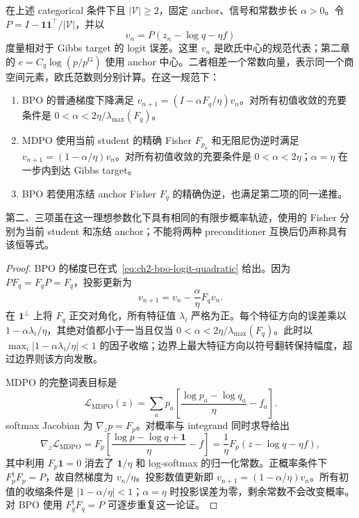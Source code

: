 \begin{theorem}
\label{thm:ch2-inner-logit-step}
在上述 categorical 条件下且 $|\mathcal V|\ge2$，固定 anchor、信号和常数步长 $\alpha>0$。令 $P=I-\mathbf1\mathbf1^\top/|\mathcal V|$，并以
\begin{equation*}
 v_n=P(z_n-\log q-\eta f)
\end{equation*}
度量相对于 Gibbs target 的 logit 误差。这里 $v_n$ 是欧氏中心的规范代表；第二章的 $e=C_q\log(p/p^{\mathrm G})$ 使用 anchor 中心。二者相差一个常数向量，表示同一个商空间元素，欧氏范数则分别计算。在这一规范下：
\begin{enumerate}
 \item BPO 的普通梯度下降满足 $v_{n+1}=(I-\alpha F_q/\eta)v_n$。对所有初值收敛的充要条件是 $0<\alpha<2\eta/\lambda_{\max}(F_q)$。
 \item MDPO 使用当前 student 的精确 Fisher $F_{p_n}$ 和无阻尼伪逆时满足 $v_{n+1}=(1-\alpha/\eta)v_n$。对所有初值收敛的充要条件是 $0<\alpha<2\eta$；$\alpha=\eta$ 在一步内到达 Gibbs target。
 \item BPO 若使用冻结 anchor Fisher $F_q$ 的精确伪逆，也满足第二项的同一递推。
\end{enumerate}
第二、三项虽在这一理想参数化下具有相同的有限步概率轨迹，使用的 Fisher 分别为当前 student 和冻结 anchor；不能将两种 preconditioner 互换后仍声称具有该恒等式。
\end{theorem}

\begin{proof}
BPO 的梯度已在式~\eqref{eq:ch2-bpo-logit-quadratic} 给出。因为 $PF_q=F_qP=F_q$，投影更新为
\begin{equation*}
 v_{n+1}=v_n-\frac\alpha\eta F_qv_n.
\end{equation*}
在 $\mathbf1^\perp$ 上将 $F_q$ 正交对角化，所有特征值 $\lambda_i$ 严格为正。每个特征方向的误差乘以 $1-\alpha\lambda_i/\eta$，其绝对值都小于一当且仅当 $0<\alpha<2\eta/\lambda_{\max}(F_q)$。此时以 $\max_i|1-\alpha\lambda_i/\eta|<1$ 的因子收缩；边界上最大特征方向以符号翻转保持幅度，超过边界则该方向发散。

MDPO 的完整词表目标是
\begin{equation*}
 \mathcal L_{\mathrm{MDPO}}(z)
 =\sum_ap_a\left[\frac{\log p_a-\log q_a}{\eta}-f_a\right].
\end{equation*}
softmax Jacobian 为 $\nabla_z p=F_p$。对概率与 integrand 同时求导给出
\begin{equation*}
 \nabla_z\mathcal L_{\mathrm{MDPO}}
 =F_p\left[\frac{\log p-\log q+\mathbf1}{\eta}-f\right]
 =\frac1\eta F_p(z-\log q-\eta f),
\end{equation*}
其中利用 $F_p\mathbf1=0$ 消去了 $\mathbf1/\eta$ 和 log-softmax 的归一化常数。正概率条件下 $F_p^\dagger F_p=P$，故自然梯度为 $v_n/\eta$。投影数值更新即 $v_{n+1}=(1-\alpha/\eta)v_n$。所有初值的收缩条件是 $|1-\alpha/\eta|<1$；$\alpha=\eta$ 时投影误差为零，剩余常数不会改变概率。对 BPO 使用 $F_q^\dagger F_q=P$ 可逐步重复这一论证。
\end{proof}

